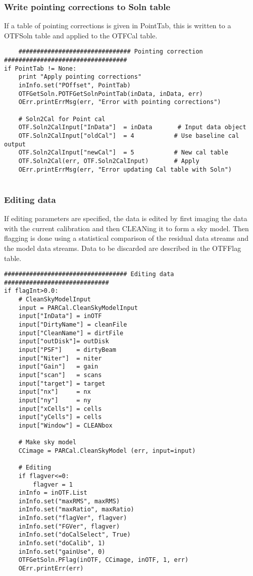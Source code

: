 \documentclass[11pt]{report}
\begin{document}
\subsubsection{Write pointing corrections to Soln table}
If a table of pointing corrections is given in PointTab, this is
written to a OTFSoln table and applied to the OTFCal table.
\begin{verbatim}
    ############################### Pointing correction ##################################
if PointTab != None:
    print "Apply pointing corrections"
    inInfo.set("POffset", PointTab)
    OTFGetSoln.POTFGetSolnPointTab(inData, inData, err)
    OErr.printErrMsg(err, "Error with pointing corrections")
        
    # Soln2Cal for Point cal
    OTF.Soln2CalInput["InData"]  = inData       # Input data object
    OTF.Soln2CalInput["oldCal"]  = 4           # Use baseline cal output
    OTF.Soln2CalInput["newCal"]  = 5           # New cal table
    OTF.Soln2Cal(err, OTF.Soln2CalInput)       # Apply
    OErr.printErrMsg(err, "Error updating Cal table with Soln")
    
\end{verbatim}

\subsubsection{Editing data}
If editing parameters are specified, the data is edited 
by first imaging the data with the current calibration and then
CLEANing it to form a sky model.
Then flagging is done using a statistical comparison of the residual
data streams and the model data streams.
Data to be discarded are described in the OTFFlag table.
\begin{verbatim}
################################## Editing data #############################
if flagInt>0.0:
    # CleanSkyModelInput
    input = PARCal.CleanSkyModelInput
    input["InData"] = inOTF
    input["DirtyName"] = cleanFile
    input["CleanName"] = dirtFile
    input["outDisk"]= outDisk
    input["PSF"]    = dirtyBeam 
    input["Niter"]  = niter
    input["Gain"]   = gain
    input["scan"]   = scans
    input["target"] = target
    input["nx"]     = nx
    input["ny"]     = ny
    input["xCells"] = cells
    input["yCells"] = cells
    input["Window"] = CLEANbox
    
    # Make sky model
    CCimage = PARCal.CleanSkyModel (err, input=input)

    # Editing
    if flagver<=0:
        flagver = 1
    inInfo = inOTF.List
    inInfo.set("maxRMS", maxRMS)
    inInfo.set("maxRatio", maxRatio)
    inInfo.set("flagVer", flagver)
    inInfo.set("FGVer", flagver)
    inInfo.set("doCalSelect", True)
    inInfo.set("doCalib", 1)
    inInfo.set("gainUse", 0)
    OTFGetSoln.PFlag(inOTF, CCimage, inOTF, 1, err)
    OErr.printErr(err)

\end{verbatim}
\end{document}
